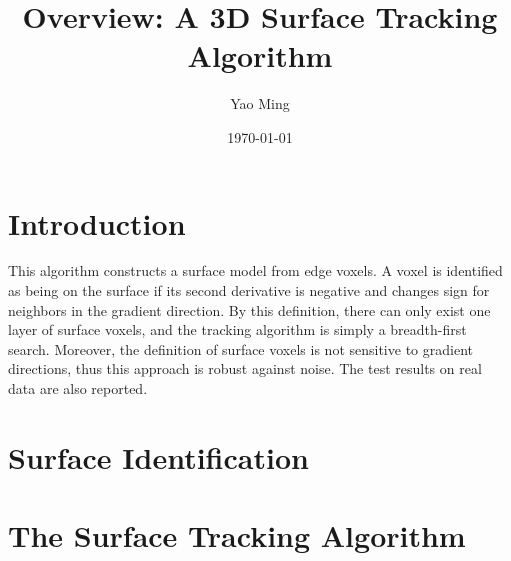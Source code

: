 \documentclass{article}
\begin{document}
\title{Overview: A 3D Surface Tracking Algorithm}
\author{Yao Ming}
\date{\today}
\maketitle
\newpage

\section{Introduction}

This algorithm constructs a surface model from edge voxels. A voxel is
identified as being on the surface if its second derivative is negative and
changes sign for neighbors in the gradient direction. By this definition, there
can only exist one layer of surface voxels, and the tracking algorithm is simply
a breadth-first search. Moreover, the definition of surface voxels is not
sensitive to gradient directions, thus this approach is robust against
noise. The test results on real data are also reported.

\section{Surface Identification}


\section{The Surface Tracking Algorithm}
\end{document}
